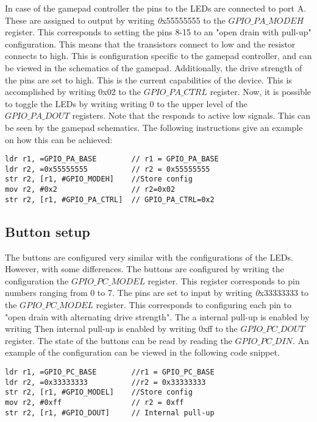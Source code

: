 In case of the gamepad controller the pins to the LEDs are connected to port A. These are assigned to output by writing {\emph 0x55555555} to  the $GPIO\_PA\_MODEH$ register. This corresponds to setting the pins 8-15 to an "open drain with pull-up" configuration\cite[p.758-759]{EFM32GG-rm}. This means that the transistors connect to low and the resistor connects to high. This is configuration specific to the gamepad controller, and can be viewed in the schematics of the gamepad\cite{compendium}. Additionally, the drive strength of the pins are set to high. This is the current capabilities of the device. This is accomplished by writing 0x02 to the $GPIO\_PA\_CTRL$ register. Now, it is possible to toggle the LEDs by writing writing 0 to the upper level of the $GPIO\_PA\_DOUT$ registers. Note that the responds to active low signals. This can be seen by the gamepad schematics\cite{compendium}. The following instructions give an example on how this can be achieved:


\begin{lstlisting}
ldr r1, =GPIO_PA_BASE        // r1 = GPIO_PA_BASE
ldr r2, =0x55555555          // r2 = 0x55555555  
str r2, [r1, #GPIO_MODEH]    //Store config
mov r2, #0x2                 // r2=0x02
str r2, [r1, #GPIO_PA_CTRL]  // GPIO_PA_CTRL=0x2                    

\end{lstlisting}


 

\subsection{Button setup}
The buttons are configured very similar with the configurations of the LEDs. However, with some differences. The buttons are configured by writing the configuration the $GPIO\_PC\_MODEL$ register. This register corresponds to pin numbers ranging from 0 to 7. The pins are set to input by writing {\emph 0x33333333} to the $GPIO\_PC\_MODEL$ register. This corresponds to configuring each pin to "open drain with alternating drive strength"\cite[p.758-759]{EFM32GG-rm}. The a internal pull-up is enabled by writing 
Then internal pull-up is enabled by writing 0xff to the $GPIO\_PC\_DOUT$ register. The state of the buttons can be read by reading the $GPIO\_PC\_DIN$. An example of the configuration can be viewed in the following code snippet. 

\begin{lstlisting}
ldr r1, =GPIO_PC_BASE        //r1 = GPIO_PC_BASE
ldr r2, =0x33333333          //r2 = 0x33333333  
str r2, [r1, #GPIO_MODEL]    //Store config
mov r2, #0xff                // r2 = 0xff
str r2, [r1, #GPIO_DOUT]     // Internal pull-up

\end{lstlisting}





